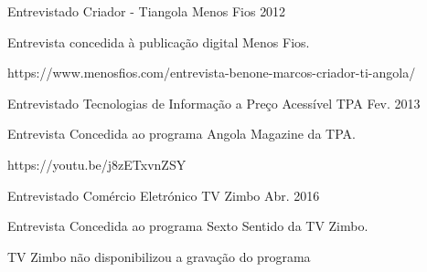 


\begin{cventries}


\cventry
{Entrevistado} %
{Criador - Tiangola} %
{Menos Fios} %
{2012} %
{ %
\begin{cvitems}
\item {Entrevista concedida à publicação digital Menos Fios.}
\item {https://www.menosfios.com/entrevista-benone-marcos-criador-ti-angola/}
\end{cvitems}
}


\cventry
{Entrevistado} %
{Tecnologias de Informação a Preço Acessível} %
{TPA} %
{Fev. 2013} %
{ %
\begin{cvitems}
\item {Entrevista Concedida ao programa Angola Magazine da TPA.}
\item {https://youtu.be/j8zETxvnZSY}
\end{cvitems}
}


\cventry
{Entrevistado} %
{Comércio Eletrónico} %
{TV Zimbo} %
{Abr. 2016} %
{ %
\begin{cvitems}
\item {Entrevista Concedida ao programa Sexto Sentido da TV Zimbo.}
\item {TV Zimbo não disponibilizou a gravação do programa}
\end{cvitems}
}



\end{cventries}
